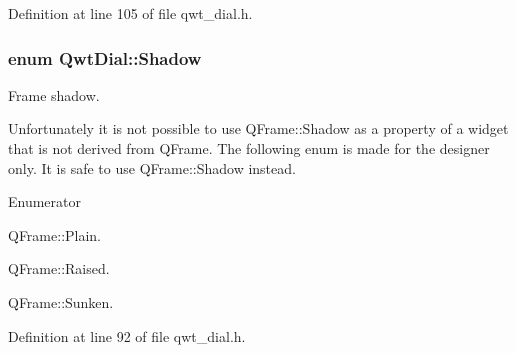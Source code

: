 Definition at line 105 of file qwt\-\_\-dial.\-h.

\hypertarget{class_qwt_dial_a7472124cb120352e8538430ab48c2386}{
\subsubsection[{Shadow}]{\setlength{\rightskip}{0pt plus 5cm}enum {\bf Qwt\-Dial\-::\-Shadow}}}\label{class_qwt_dial_a7472124cb120352e8538430ab48c2386}


Frame shadow. 

Unfortunately it is not possible to use Q\-Frame\-::\-Shadow as a property of a widget that is not derived from Q\-Frame. The following enum is made for the designer only. It is safe to use Q\-Frame\-::\-Shadow instead. \begin{Desc}
\item[Enumerator]\par
\begin{description}
\item[{\em 
\hypertarget{class_qwt_dial_a7472124cb120352e8538430ab48c2386a8d0cdae56d44bcd25574d7e432498d86}{Plain}\label{class_qwt_dial_a7472124cb120352e8538430ab48c2386a8d0cdae56d44bcd25574d7e432498d86}
}]Q\-Frame\-::\-Plain. \item[{\em 
\hypertarget{class_qwt_dial_a7472124cb120352e8538430ab48c2386a4054b8890d1f837387762b4a12157847}{Raised}\label{class_qwt_dial_a7472124cb120352e8538430ab48c2386a4054b8890d1f837387762b4a12157847}
}]Q\-Frame\-::\-Raised. \item[{\em 
\hypertarget{class_qwt_dial_a7472124cb120352e8538430ab48c2386ae1388e8ff1a378e22cd082fcb46aa685}{Sunken}\label{class_qwt_dial_a7472124cb120352e8538430ab48c2386ae1388e8ff1a378e22cd082fcb46aa685}
}]Q\-Frame\-::\-Sunken. \end{description}
\end{Desc}


Definition at line 92 of file qwt\-\_\-dial.\-h.



